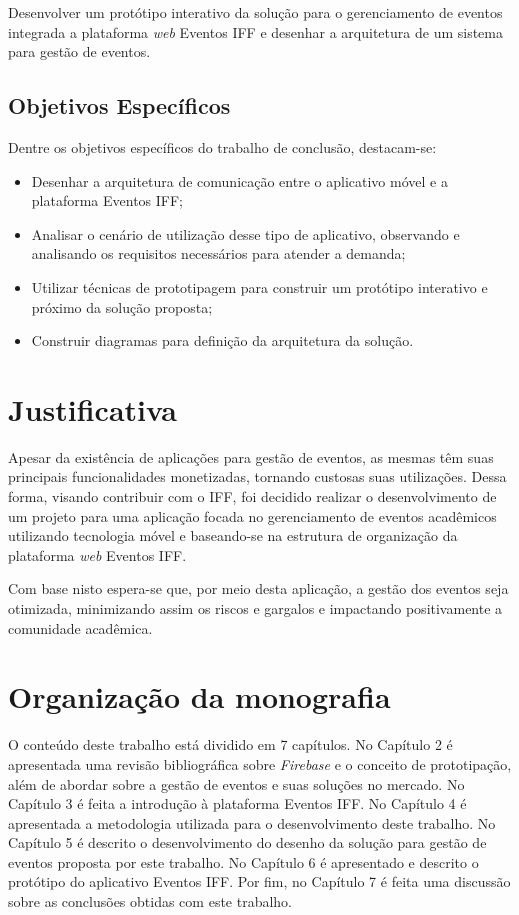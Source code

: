 Desenvolver um protótipo interativo da solução para o gerenciamento de eventos integrada a plataforma \textit{web} Eventos IFF e desenhar a arquitetura de um sistema para gestão de eventos.

\subsection{Objetivos Específicos}

Dentre os objetivos específicos do trabalho de conclusão, destacam-se:
\begin{itemize}
    \item Desenhar a arquitetura de comunicação entre o aplicativo móvel e a plataforma Eventos IFF;
    \item Analisar o cenário de utilização desse tipo de aplicativo, observando e analisando os requisitos necessários para atender a demanda;
    \item Utilizar técnicas de prototipagem para construir um protótipo interativo e próximo da solução proposta;
    \item Construir diagramas para definição da arquitetura da solução. 
\end{itemize}

\section{Justificativa}

Apesar da existência de aplicações para gestão de eventos, as mesmas têm suas principais funcionalidades monetizadas, tornando custosas suas utilizações. Dessa forma, visando contribuir com o IFF, foi decidido realizar o desenvolvimento de um projeto para uma aplicação focada no gerenciamento de eventos acadêmicos utilizando tecnologia móvel e baseando-se na estrutura de organização da plataforma \textit{web} Eventos IFF.

Com base nisto espera-se que, por meio desta aplicação, a gestão dos eventos seja otimizada, minimizando assim os riscos e gargalos e impactando positivamente a comunidade acadêmica.

\section{Organização da monografia}

O conteúdo deste trabalho está dividido em 7 capítulos. No Capítulo 2 é apresentada uma revisão bibliográfica sobre \textit{Firebase} e o conceito de prototipação, além de abordar sobre a gestão de eventos e suas soluções no mercado. No Capítulo 3 é feita a introdução à plataforma Eventos IFF. No Capítulo 4 é apresentada a metodologia utilizada para o desenvolvimento deste trabalho. No Capítulo 5 é descrito o desenvolvimento do desenho da solução para gestão de eventos proposta por este trabalho. No Capítulo 6 é apresentado e descrito o protótipo do aplicativo Eventos IFF. Por fim, no Capítulo 7 é feita uma discussão sobre as conclusões obtidas com este trabalho.
